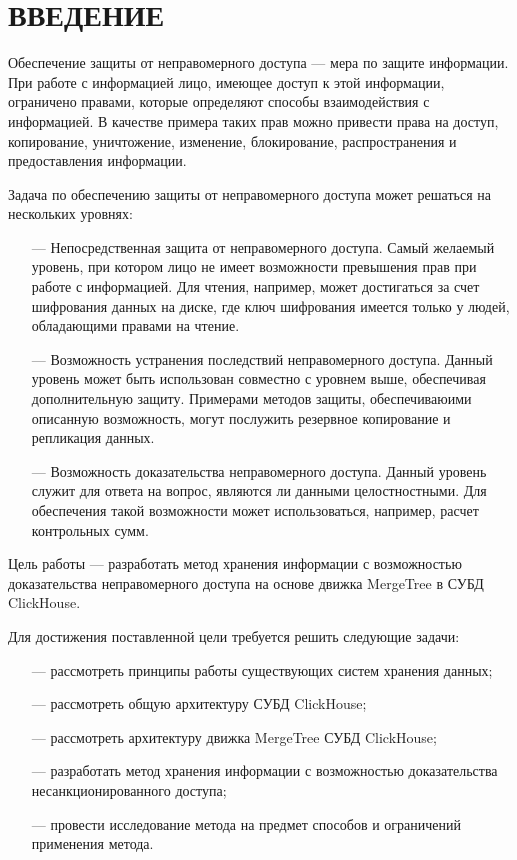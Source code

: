 \section*{ВВЕДЕНИЕ}

Обеспечение защиты от неправомерного доступа --- мера по защите информации. При работе с информацией лицо, имеющее доступ к этой информации, ограничено правами, которые определяют способы взаимодействия с информацией. В качестве примера таких прав можно привести права на доступ, копирование, уничтожение, изменение, блокирование, распространения и предоставления информации.

Задача по обеспечению защиты от неправомерного доступа может решаться на нескольких уровнях:
\begin{itemize}
    \item[---] Непосредственная защита от неправомерного доступа. Самый желаемый уровень, при котором лицо не имеет возможности превышения прав при работе с информацией. Для чтения, например, может достигаться за счет шифрования данных на диске, где ключ шифрования имеется только у людей, обладающими правами на чтение.
    \item[---] Возможность устранения последствий неправомерного доступа. Данный уровень может быть использован совместно с уровнем выше, обеспечивая дополнительную защиту. Примерами методов защиты, обеспечиваюими описанную возможность, могут послужить резервное копирование и репликация данных.
    \item[---] Возможность доказательства неправомерного доступа. Данный уровень служит для ответа на вопрос, являются ли данными целостностными. Для обеспечения такой возможности может использоваться, например, расчет контрольных сумм.
\end{itemize}

Цель работы --- разработать метод хранения информации с возможностью доказательства неправомерного доступа на основе движка MergeTree\cite{MergeTree} в СУБД ClickHouse\cite{ch}.
 

Для достижения поставленной цели требуется решить следующие задачи:
\begin{itemize}
    \item[---] рассмотреть принципы работы существующих систем хранения данных;
    \item[---] рассмотреть общую архитектуру СУБД ClickHouse;
    \item[---] рассмотреть архитектуру движка MergeTree СУБД ClickHouse;
    \item[---] разработать метод хранения информации с возможностью доказательства несанкционированного доступа;
    \item[---] провести исследование метода на предмет способов и ограничений применения метода.
\end{itemize}

\pagebreak